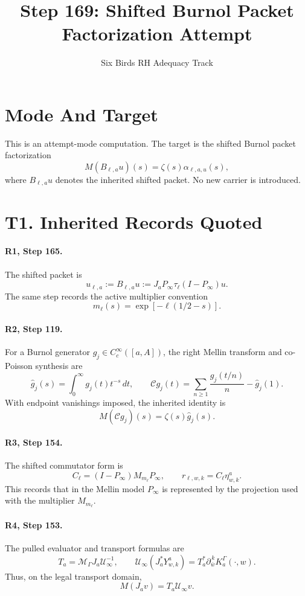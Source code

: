 \documentclass[11pt]{article}
\title{Step 169: Shifted Burnol Packet Factorization Attempt}
\author{Six Birds RH Adequacy Track}
\date{}
\newcommand{\Pinfty}{P_{\infty}}
\newcommand{\Mell}{M}
\newcommand{\Uinf}{\mathcal U_{\infty}}
\newcommand{\Cell}{C_{\ell}}
\newcommand{\Chat}{\mathcal C}
\newcommand{\zetaF}{\zeta}
\begin{document}
\maketitle

\section{Mode And Target}

This is an attempt-mode computation. The target is the shifted Burnol packet
factorization
\[
  \Mell(B_{\ell,a}u)(s)=\zetaF(s)\alpha_{\ell,a,u}(s),
\]
where \(B_{\ell,a}u\) denotes the inherited shifted packet. No new carrier is
introduced.

\section{T1. Inherited Records Quoted}

\paragraph{R1, Step 165.}
The shifted packet is
\[
  u_{\ell,a}:=B_{\ell,a}u
  :=
  J_a\Pinfty\tau_\ell(I-\Pinfty)u.
\]
The same step records the active multiplier convention
\[
  m_\ell(s)=\exp[-\ell(1/2-s)].
\]

\paragraph{R2, Step 119.}
For a Burnol generator \(g_j\in C_c^\infty([a,A])\), the right Mellin
transform and co-Poisson synthesis are
\[
  \widehat g_j(s)=\int_0^\infty g_j(t)t^{-s}\,dt,
\qquad
  \Chat g_j(t)=\sum_{n\ge1}\frac{g_j(t/n)}{n}-\widehat g_j(1).
\]
With endpoint vanishings imposed, the inherited identity is
\[
  \Mell(\Chat g_j)(s)=\zetaF(s)\widehat g_j(s).
\]

\paragraph{R3, Step 154.}
The shifted commutator form is
\[
  \Cell=(I-\Pinfty)M_{m_\ell}\Pinfty,
\qquad
  r_{\ell,w,k}=\Cell\eta^a_{w,k}.
\]
This records that in the Mellin model \(P_\infty\) is represented by the
projection used with the multiplier \(M_{m_\ell}\).

\paragraph{R4, Step 153.}
The pulled evaluator and transport formulas are
\[
  T_a=\mathcal M_\Gamma J_a\Uinf^{-1},
\qquad
  \Uinf(J_a^*Y^a_{w,k})
  =
  T_a^*\partial_{\bar w}^{\,k}K_a^\Gamma(\cdot,w).
\]
Thus, on the legal transport domain,
\[
  \Mell(J_av)=T_a\Uinf v.
\]
\end{document}
